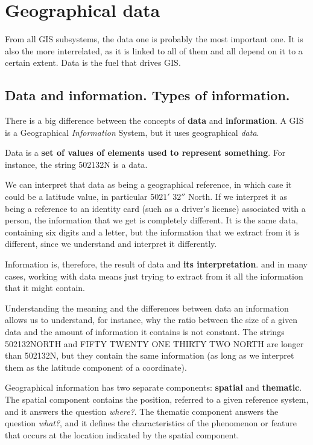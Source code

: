 

\chapter{Geographical data}

\pagestyle{fancy}

From all GIS subsystems, the data one is probably the most important one. It is also the more interrelated, as it is linked to all of them and all depend on it to a certain extent. Data is the fuel that drives GIS. 

\section{Data and information. Types of information.}

There is a big difference between the concepts of \textbf{data} and \textbf{information}. A GIS is a Geographical \emph{Information} System, but it uses geographical \emph{data}.

Data is a \textbf{set of values of elements used to represent something}. For instance, the string 502132N is a data.

We can interpret that data as being a geographical reference, in which case it could be a latitude value, in particular 50\degree $21'$ $32''$ North. If we interpret it as being a reference to an identity card (such as a driver's license) associated with a person, the information that we get is completely different. It is the same data, containing six digits and a letter, but the information that we extract from it is different, since we understand and interpret it differently. 

Information is, therefore, the result of data and \textbf{its interpretation}. and in many cases, working with data means just trying to extract from it all the information that it might contain.

Understanding the meaning and the differences between data an information allows us to understand, for instance, why the ratio between the size of a given data and the amount of information it contains is not constant. The strings 502132NORTH and FIFTY TWENTY ONE THIRTY TWO NORTH are longer than 502132N, but they contain the same information (as long as we interpret them as the latitude component of a coordinate).

Geographical information has two separate components: \textbf{spatial} and \textbf{thematic}. The spatial component contains the position, referred to a given reference system, and it answers the question \emph{where?}. The thematic component answers the question \emph{what?}, and it defines the characteristics of the phenomenon or feature that occurs at the location indicated by the spatial component.

